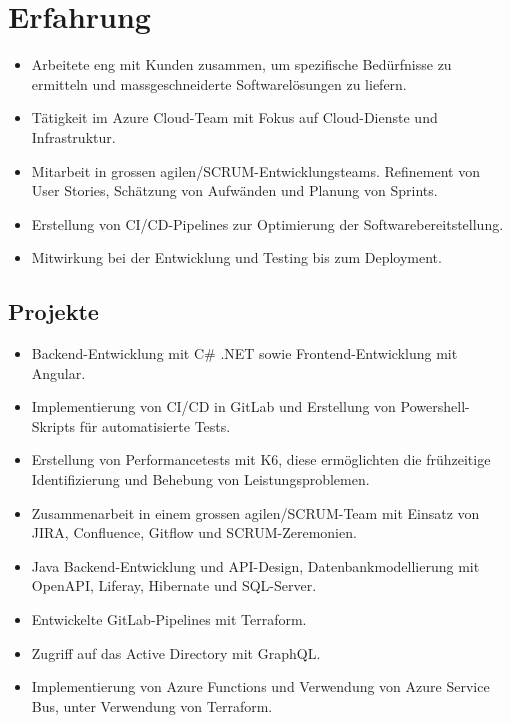 \section{Erfahrung}
\begin{itemize}
\item Arbeitete eng mit Kunden zusammen, um spezifische Bedürfnisse zu ermitteln und massgeschneiderte Softwarelösungen zu liefern.
\item Tätigkeit im Azure Cloud-Team mit Fokus auf Cloud-Dienste und Infrastruktur.
\item Mitarbeit in grossen agilen/SCRUM-Entwicklungsteams. Refinement von User Stories, Schätzung von Aufwänden und Planung von Sprints.
\item Erstellung von CI/CD-Pipelines zur Optimierung der Softwarebereitstellung.
\item Mitwirkung bei der Entwicklung und Testing bis zum Deployment.
\end{itemize}
\subsection*{Projekte}
\begin{itemize}
\item Backend-Entwicklung mit C\# .NET sowie Frontend-Entwicklung mit Angular.
\item Implementierung von CI/CD in GitLab und Erstellung von Powershell-Skripts für automatisierte Tests.
\item Erstellung von Performancetests mit K6, diese ermöglichten die frühzeitige Identifizierung und Behebung von Leistungsproblemen.
\end{itemize}
\dottedline
{}
\begin{itemize}
\item Zusammenarbeit in einem grossen agilen/SCRUM-Team mit Einsatz von JIRA, Confluence, Gitflow und SCRUM-Zeremonien.
\item Java Backend-Entwicklung und API-Design, Datenbankmodellierung mit OpenAPI, Liferay, Hibernate und SQL-Server.
\end{itemize}
\dottedline
{}
\begin{itemize}
\item Entwickelte GitLab-Pipelines mit Terraform.
\item Zugriff auf das Active Directory mit GraphQL.
\item Implementierung von Azure Functions und Verwendung von Azure Service Bus, unter Verwendung von Terraform.
\end{itemize}

